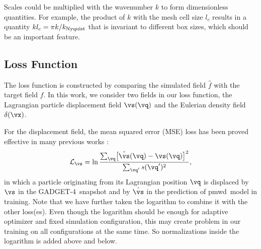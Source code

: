 \documentclass[modern, trackchanges, dvipsnames]{aastex631}
\newcommand{\pmwd}{{\usefont{T1}{nova}{m}{sl}pmwd}}
\newcommand{\GADGET}{{{\fontsize{10pt}{12pt}\selectfont GADGET}-4}}
\newcommand{\cL}{\mathcal{L}}
\begin{document}
Scales could be multiplied with the wavenumber $k$ to form dimensionless
quantities.
For example, the product of $k$ with the mesh cell size $l_c$ results in
a quantity $kl_c = \pi k/k_{\rm Nyquist}$ that is invariant to different
box sizes, which should be an important feature.

\vspace{1em}
\subsection{Loss Function}
\label{sec:loss}

The loss function is constructed by comparing the simulated field $\hat
f$ with the target field $f$.
In this work, we consider two fields in our loss function, the
Lagrangian particle displacement field $\vs(\vq)$ and the Eulerian
density field $\delta(\vx)$.

For the displacement field, the mean squared error (MSE) loss has been
proved effective in many previous works
\citep[e.g.,][]{HeEtAl2019, LiEtAl2021}:
%
\begin{equation}
\cL_\vs = \ln \frac{\sum_\vq \bigl[ \hat\vs(\vq) - \vs(\vq) \bigr]^2}
                   {\sum_{\vq'} s(\vq')^2},
\end{equation}
%
in which a particle originating from its Lagrangian position $\vq$ is
displaced by $\vs$ in the \GADGET\ snapshot and by $\hat\vs$ in the
prediction of \pmwd\ model in training.
Note that we have further taken the logarithm to combine it with the
other loss(es).
Even though the logarithm should be enough for adaptive optimizer and
fixed simulation configuration, this may create problem in our training
on all configurations at the same time.
So normalizations inside the logarithm is added above and below.
\end{document}
